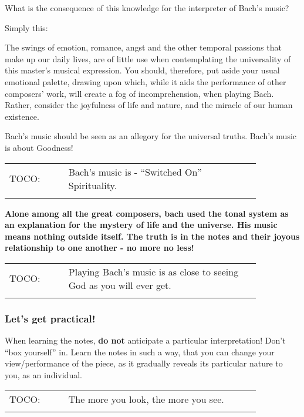 \documentclass{article}
\begin{document}
What is the consequence of this knowledge for the interpreter of Bach's music?

Simply this:

The swings of emotion, romance, angst and the other temporal passions that make up our daily lives, are of  little use when contemplating the universality of this master's musical expression.
You should, therefore, put aside your usual emotional palette, drawing upon which, while it aids the performance of other composers' work, will create a fog of incomprehension, when playing Bach.
Rather, consider the joyfulness of life and nature, and the miracle of our human existence.

Bach's music should be seen as an allegory for the universal truths.
Bach's music is about Goodness!

\begin{tabular}{p{0.2\linewidth}p{0.65\linewidth}}
    \\
    TOCO: & Bach's music is - ``Switched On'' Spirituality.\\
    \\
\end{tabular}

\textbf{Alone among all the great composers, bach used the tonal system as an explanation for the mystery of life and the universe.
His music means nothing outside itself.
The truth is in the notes and their joyous  relationship to one another - no more no less!}

\begin{tabular}{p{0.2\linewidth}p{0.65\linewidth}}
    \\
    TOCO: & Playing Bach's music is as close to seeing God as you will ever get.\\
    \\
\end{tabular}

\subsubsection{Let's get practical!}

When learning the notes, \textbf{do not} anticipate a particular interpretation!
Don't ``box yourself'' in.
Learn the notes in such a way, that you can change your view/performance of the piece, as it gradually reveals its particular nature to you, as an individual.

\begin{tabular}{p{0.2\linewidth}p{0.65\linewidth}}
    \\
    TOCO: & The more you look, the more you see.\\
    \\
\end{tabular}
\end{document}
